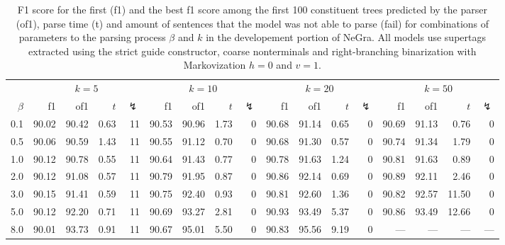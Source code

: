 \documentclass[../../document.tex]{subfiles}
\begin{document}
    \begin{table}
        \caption{\label{tbl:grid:parsing:dcp}
        F1 score for the first (f1) and the best f1 score among the first 100 constituent trees predicted by the parser (of1), parse time (t) and amount of sentences that the model was not able to parse (fail) for combinations of parameters to the parsing process $\beta$ and $k$ in the developement portion of NeGra. All models use  supertags extracted using the strict guide constructor, coarse nonterminals and right-branching binarization with Markovization $h=0$ and $v=1$.
        }
        \centering\small
        \setlength{\tabcolsep}{4pt}
        \vspace{.2cm}
        \begin{tabular}{r|rrrr|rrrr|rrrr|rrrr}
            \toprule
            & \multicolumn{4}{c|}{$k = 5$} & \multicolumn{4}{c|}{$k = 10$} & \multicolumn{4}{c|}{$k = 20$} & \multicolumn{4}{c}{$k = 50$} \\
$\beta$     & f1 & of1 & $t$ & $\lightning$ & f1 & of1 & $t$ & $\lightning$ & f1 & of1 & $t$ & $\lightning$ & f1 & of1 & $t$ & $\lightning$   \\ \hline
0.1   & 90.02 & 90.42 & 0.63 & 11 & 90.53 & 90.96 & 1.73 & 0 & 90.68 & 91.14 & 0.65 & 0 & 90.69 & 91.13 & 0.76 & 0\\
0.5   & 90.06 & 90.59 & 1.43 & 11 & 90.55 & 91.12 & 0.70 & 0 & 90.68 & 91.30 & 0.57 & 0 & 90.74 & 91.34 & 1.79 & 0\\
1.0   & 90.12 & 90.78 & 0.55 & 11 & 90.64 & 91.43 & 0.77 & 0 & 90.78 & 91.63 & 1.24 & 0 & 90.81 & 91.63 & 0.89 & 0\\
2.0   & 90.12 & 91.08 & 0.57 & 11 & 90.79 & 91.95 & 0.87 & 0 & 90.86 & 92.14 & 0.69 & 0 & 90.89 & 92.11 & 2.46 & 0\\
3.0   & 90.15 & 91.41 & 0.59 & 11 & 90.75 & 92.40 & 0.93 & 0 & 90.81 & 92.60 & 1.36 & 0 & 90.82 & 92.57 & 11.50 & 0\\
5.0   & 90.12 & 92.20 & 0.71 & 11 & 90.69 & 93.27 & 2.81 & 0 & 90.93 & 93.49 & 5.37 & 0 & 90.86 & 93.49 & 12.66 & 0\\
8.0   & 90.01 & 93.73 & 0.91 & 11 & 90.67 & 95.01 & 5.50 & 0 & 90.83 & 95.56 & 9.19 & 0 & --- & --- & --- & ---\\
\bottomrule
        \end{tabular}
    \end{table}
\end{document}
